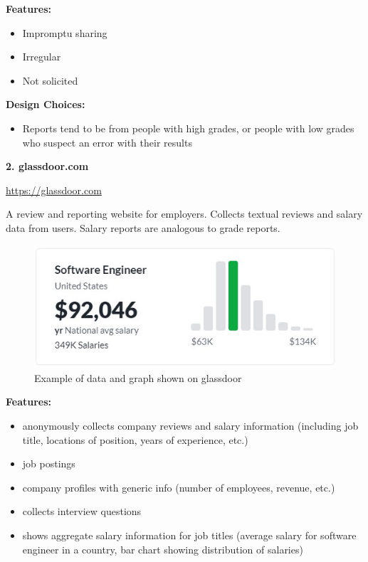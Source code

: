 \documentclass{article}
\begin{document}
\noindent \textbf{Features:}
\begin{itemize}
\item Impromptu sharing
\item Irregular
\item Not solicited
\end{itemize}
\medskip

\noindent \textbf{Design Choices:}
\begin{itemize}
\item Reports tend to be from people with high grades, or people with low grades who suspect an error with their results
\end{itemize}
\medskip

\noindent \textbf{2. glassdoor.com}

\noindent \url{https://glassdoor.com}
\bigskip

\noindent A review and reporting website for employers. Collects textual reviews and salary data from users. Salary reports are analogous to grade reports.
\bigskip

\begin{figure}[h]
\noindent \includegraphics{glassdoor1}
\centering
\caption{Example of data and graph shown on glassdoor}
\label{fig: glassdoor-data}
\end{figure}

\noindent \textbf{Features:}
\begin{itemize}
\item anonymously collects company reviews and salary information (including job title, locations of position, years of experience, etc.)
\item job postings
\item company profiles with generic info (number of employees, revenue, etc.)
\item collects interview questions
\item shows aggregate salary information for job titles (average salary for software engineer in a country, bar chart showing distribution of salaries)
\end{itemize}
\medskip
\end{document}
